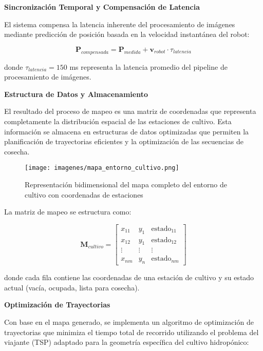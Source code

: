 \textbf{Sincronización Temporal y Compensación de Latencia}

El sistema compensa la latencia inherente del procesamiento de imágenes mediante predicción de posición basada en la velocidad instantánea del robot:

\begin{equation}
\mathbf{P}_{compensada} = \mathbf{P}_{medida} + \mathbf{v}_{robot} \cdot \tau_{latencia}
\end{equation}

donde $\tau_{latencia} = 150$ ms representa la latencia promedio del pipeline de procesamiento de imágenes.

\textbf{Estructura de Datos y Almacenamiento}

El resultado del proceso de mapeo es una matriz de coordenadas que representa completamente la distribución espacial de las estaciones de cultivo. Esta información se almacena en estructuras de datos optimizadas que permiten la planificación de trayectorias eficientes y la optimización de las secuencias de cosecha.

\begin{figure}[h]
\centering
\texttt{[image: imagenes/mapa\_entorno\_cultivo.png]}
\caption{Representación bidimensional del mapa completo del entorno de cultivo con coordenadas de estaciones}
\label{fig:mapa_entorno_cultivo}
\end{figure}

La matriz de mapeo se estructura como:

\begin{equation}
\mathbf{M}_{cultivo} = \begin{bmatrix}
x_{11} & y_1 & \text{estado}_{11} \\
x_{12} & y_1 & \text{estado}_{12} \\
\vdots & \vdots & \vdots \\
x_{nm} & y_n & \text{estado}_{nm}
\end{bmatrix}
\end{equation}

donde cada fila contiene las coordenadas de una estación de cultivo y su estado actual (vacía, ocupada, lista para cosecha).

\textbf{Optimización de Trayectorias}

Con base en el mapa generado, se implementa un algoritmo de optimización de trayectorias que minimiza el tiempo total de recorrido utilizando el problema del viajante (TSP) adaptado para la geometría específica del cultivo hidropónico:

